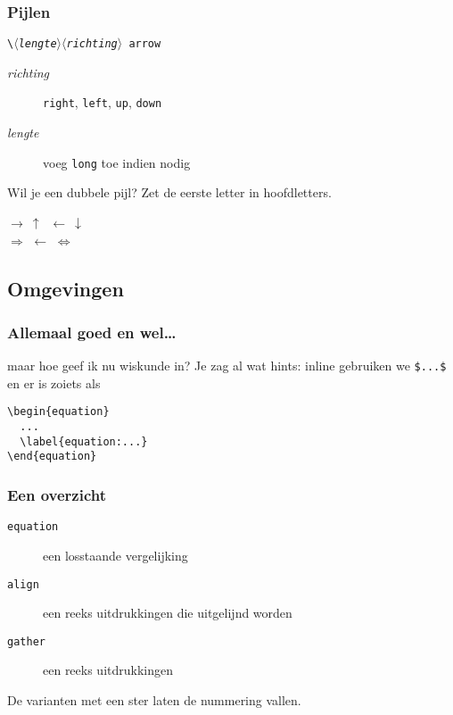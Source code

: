 \begin{frame}[fragile]
  \frametitle{Pijlen}

  \texttt{\textbackslash $\langle$\textsl{lengte}$\rangle\langle$\textsl{richting}$\rangle$ arrow}

  \begin{description}
    \item[\textsl{richting}] \texttt{right}, \texttt{left}, \texttt{up}, \texttt{down}
    \item[\textsl{lengte}] voeg \texttt{long} toe indien nodig
  \end{description}

  Wil je een dubbele pijl? Zet de eerste letter in hoofdletters.
  \begin{LTXexample}
$\rightarrow\ \uparrow\ $
$\leftarrow\ \downarrow$ \\
$\Rightarrow$
$\longleftarrow$
$\Leftrightarrow$
  \end{LTXexample}
\end{frame}


\subsection{Omgevingen}
\begin{frame}[fragile]
  \frametitle{Allemaal goed en wel\ldots}

  maar hoe geef ik nu wiskunde in? Je zag al wat hints: inline gebruiken we \verb|$...$| en er is zoiets als
  \begin{verbatim}
\begin{equation}
  ...
  \label{equation:...}
\end{equation}
  \end{verbatim}
\end{frame}

\begin{frame}[fragile]
  \frametitle{Een overzicht}

  \begin{description}
    \item[\texttt{equation}] een losstaande vergelijking
    \item[\texttt{align}] een reeks uitdrukkingen die uitgelijnd worden
    \item[\texttt{gather}] een reeks uitdrukkingen
  \end{description}

  De varianten met een ster laten de nummering vallen.
\end{frame}

